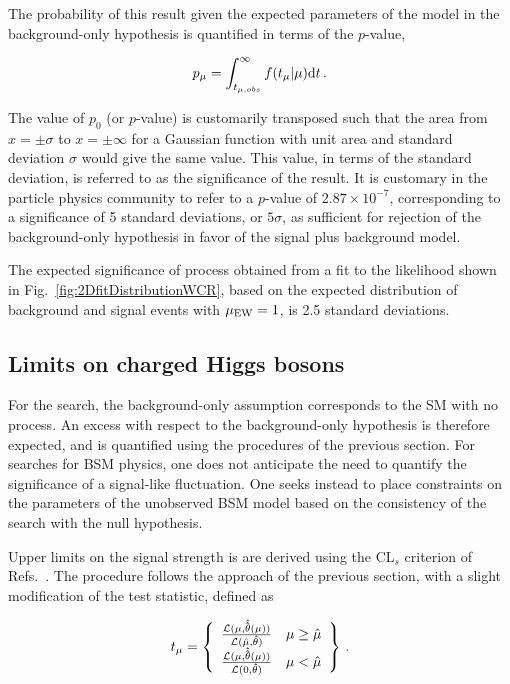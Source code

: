 The probability of this result given the expected
parameters of the model in the background-only hypothesis
is quantified in terms of the $p$-value,

\begin{equation}
  p_{\mu} = \int_{t_{\mu, obs}}^{\infty} f(t_{\mu} | \mu) {\rm d}t \,.
  \label{eq:pvalue}
\end{equation}

The value of $p_{0}$ (or $p$-value) is customarily transposed such that the area from
$x=\pm\sigma$ to $x=\pm\infty$ for a Gaussian function with unit area and standard
deviation $\sigma$ would give the same value. This value, in terms of the standard
deviation, is referred to as the significance of the result.
It is customary in the particle physics community to refer to a $p$-value
of $2.87 \times 10^{-7}$, corresponding to a significance of 5 standard 
deviations, or $5 \sigma$, as sufficient for rejection of the background-only
hypothesis in favor of the signal plus background model. 

The expected significance of \EWWZ process obtained from a fit to the likelihood
shown in Fig.~\ref{fig:2DfitDistributionWCR},
based on the expected distribution
of background and signal events with $\mu_{\rm EW} = 1$, is 2.5 standard deviations.

\subsection{Limits on charged Higgs bosons}

For the \EWWZ search, the background-only assumption corresponds to the SM with
no \EWWZ process. An excess with respect to the background-only hypothesis is therefore
expected, and is quantified using the procedures of the previous section. For searches 
for BSM physics, one does not anticipate the need to quantify the significance of a signal-like
fluctuation. One seeks instead to place constraints on the parameters of the unobserved BSM model
based on the consistency of the search with the null hypothesis. 

Upper limits on the signal strength is are derived using the CL$_{s}$ criterion of Refs.~\cite{Junk:1999kv,CLS2,Cowan:2010js}.
The procedure follows the approach of the previous section, with a
slight modification of the test statistic,
defined as

\begin{equation}
  t_{\mu} = \left\{ 
\begin{array}{c l}
  \frac{\mathcal{L}(\mu,{\bf \hat{\hat{\theta}}}(\mu))}
    {\mathcal{L}(\hat{\mu},{\bf \hat{\theta}})}           & \mu \ge \hat{\mu} \\
  \frac{\mathcal{L}(\mu,{\bf \hat{\hat{\theta}}}(\mu))}
    {\mathcal{L}(0,{\bf \hat{\theta}})}           & \mu < \hat{\mu} \\

\end{array}\right\} \,.
\end{equation}


